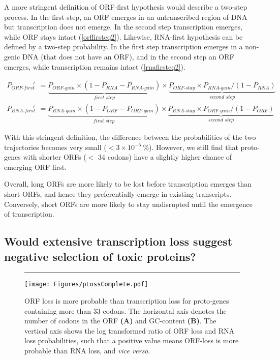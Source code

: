 \documentclass[12pt,a4paper]{article}
\begin{document}
A more stringent definition of ORF-first hypothesis would describe a two-step process. In the first step, an ORF emerges in an untranscribed region of DNA but transcription does not emerge. In the second step transcription emerges, while ORF stays intact (\autoref{orffirsteq2}). Likewise, RNA-first hypothesis can be defined by a two-step probability. In the first step transcription emerges in a non-genic DNA (that does not have an ORF), and in the second step an ORF emerges, while transcription remains intact (\autoref{rnafirsteq2}).

\begin{align}
P_\textit{ORF-first}' & = \underbrace{P_\textit{ORF-gain} \times (1-P_\textit{RNA} -P_\textit{RNA-gain})}_\textit{first step} \times \underbrace{P_\textit{ORF-stay}\times P_\textit{RNA-gain}/(1-P_\textit{RNA})}_\textit{second step} \label{orffirsteq2}\\[1em]
P_\textit{RNA-first}' & = \underbrace{P_\textit{RNA-gain} \times (1-P_\textit{ORF} -P_\textit{ORF-gain})}_\textit{first step} \times \underbrace{P_\textit{RNA-stay}\times P_\textit{ORF-gain}/(1-P_\textit{ORF})}_\textit{second step}\label{rnafirsteq2}
\end{align}

With this stringent definition, the difference between the probabilities of the two trajectories becomes very small ($< 3\times10^{-5}\ \%$). However, we still find that proto-genes with shorter ORFs ($<$ 34 codons) have a slightly higher chance of emerging ORF first.

Overall, long ORFs are more likely to be lost before transcription emerges than short ORFs, and hence they preferentially emerge in existing transcripts. Conversely, short ORFs are more likely to stay undisrupted until the emergence of transcription.

\subsection{Would extensive transcription loss suggest negative selection of toxic proteins?}


\begin{figure}[!b]
\centering
\hrule
\vspace{1ex}
\texttt{[image: Figures/pLossComplete.pdf]}
\caption{ORF loss is more probable than transcription loss for proto-genes containing more than 33 codons. The horizontal axis denotes the number of codons in the ORF \textbf{(A)} and GC-content \textbf{(B)}. The vertical axis shows the log transformed ratio of ORF loss and RNA loss probabilities, such that a positive value means ORF-loss is more probable than RNA loss, and \textit{vice versa}.}
\label{lossprob}
\end{figure}
\end{document}
